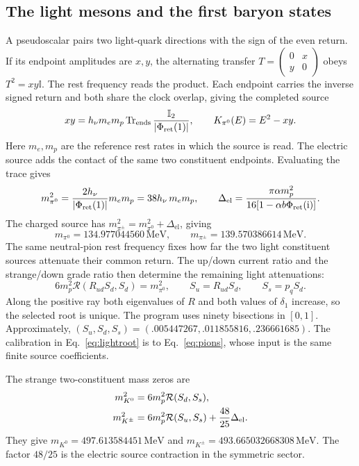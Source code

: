 \documentclass[aps,prx,onecolumn,10pt,notitlepage,nofootinbib,longbibliography]{revtex4-2}
\numberwithin{equation}{section}
\numberwithin{table}{section}
\newcommand{\Id}{\mathbb I}
\newcommand{\Tr}{\operatorname{Tr}}
\newcommand{\ii}{\mathrm i}
\newcommand{\MeV}{\,\mathrm{MeV}}
\newcommand{\hover}{h_\nu}
\newcommand{\Phis}{\Phi_{\rm ret}}
\begin{document}
\subsection{The light mesons and the first baryon states}
A pseudoscalar pairs two light-quark directions with the sign of the even return. If its endpoint amplitudes are $x,y$, the alternating transfer $T=\left(\begin{smallmatrix}0&x\\y&0\end{smallmatrix}\right)$ obeys $T^2=xy\Id$. The rest frequency reads the product. Each endpoint carries the inverse signed return and both share the clock overlap, giving the completed source
\begin{equation}
 xy=\hover m_em_p\Tr_{\rm ends}\frac{\Id_2}{|\Phis(1)|},\qquad
 K_{\pi^0}(E)=E^2-xy.
 \label{eq:pionendpointsource}
\end{equation}
Here $m_e,m_p$ are the reference rest rates in which the source is read. The electric source adds the contact of the same two constituent endpoints. Evaluating the trace gives
\begin{equation}
 m_{\pi^0}^2=\frac{2\hover}{|\Phis(1)|}m_em_p=38\hover\,m_em_p,\qquad
 \Delta_{\mathrm{el}}=\frac{\pi\alpha m_p^2}{16[1-\alpha b\Phis(\ii)]}.
\end{equation}
The charged source has $m_{\pi^\pm}^2=m_{\pi^0}^2+\Delta_{\mathrm{el}}$, giving
\begin{equation}
 m_{\pi^0}=134.977044560\MeV,\qquad
 m_{\pi^\pm}=139.570386614\MeV.
 \label{eq:pions}
\end{equation}
The same neutral-pion rest frequency fixes how far the two light constituent sources attenuate their common return. The up/down current ratio and the strange/down grade ratio then determine the remaining light attenuations:
\begin{equation}
 6m_p^2\mathcal R(R_{ud}S_d,S_d)=m_{\pi^0}^2,\qquad
 S_u=R_{ud}S_d,\qquad S_s=p_qS_d.
 \label{eq:lightroot}
\end{equation}
Along the positive ray both eigenvalues of $R$ and both values of $\delta_1$ increase, so the selected root is unique. The program uses ninety bisections in $[0,1]$. Approximately,
$(S_u,S_d,S_s)=(.005447267,.011855816,.236661685)$. The calibration in Eq.~\eqref{eq:lightroot} is to Eq.~\eqref{eq:pions}, whose input is the same finite source coefficients.

The strange two-constituent mass zeros are
\begin{align}
 m_{K^0}^2&=6m_p^2\mathcal R(S_d,S_s),\notag\\
 m_{K^\pm}^2&=6m_p^2\mathcal R(S_u,S_s)+\frac{48}{25}\Delta_{\mathrm{el}}.\label{eq:kaons}
\end{align}
They give $m_{K^0}=497.613584451\MeV$ and $m_{K^\pm}=493.665032668308\MeV$. The factor $48/25$ is the electric source contraction in the symmetric sector.
\end{document}
